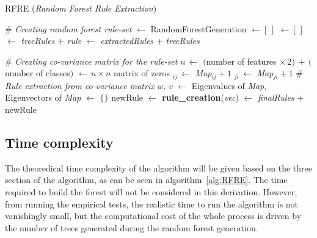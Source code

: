 \documentclass[10pt]{article}
\begin{document}
\begin{algorithm}[!ht]
\caption{RFRE (\textit{Random Forest Rule Extraction})}\label{alg:RFRE}
\begin{algorithmic}
\State \# {\sl Creating random forest rule-set}
 $\gets$ RandomForestGeneration		
 $\gets [\, ]$
	  $\gets [\,]$
		 $\gets$ {\sl treeRules} $+$ {\sl rule} 
	\EndFor
	 $\gets$ {\sl extractedRules} + {\sl treeRules}
\EndFor

\State
\State \# {\sl Creating co-variance matrix for the rule-set}
\State $n \, \gets$ $($number of features $\times \, 2) \, + \,($number of classes$)$ 
 $\gets \, n\times n$ matrix of zeros
		$_{ij} \, \gets$  {\sl Map}$_{ij} + 1$
		$_{ji} \, \gets$  {\sl Map}$_{ji} + 1$
	\EndIf
\EndFor
\State 
\State \# {\sl Rule extraction from co-variance matrix}
\State $w, \, v$ $\gets$ Eigenvalues of {\sl Map}, Eigenvectors of {\sl Map }
 $\gets$ $\{\}$
	\State newRule $\gets $ \textbf{rule\_creation}({\sl  vec})
	 $\gets$ {\sl finalRules} $+$ newRule
	\EndIf
\EndFor
\State {}
\end{algorithmic}
\end{algorithm}

\subsection{Time complexity}
The theoredical time complexity of the algorithm will be given based on the three section of the algorithm, as can be seen in algorithm~\ref{alg:RFRE}. The time required to build the forest will not be considered in this derivation. However, from running the empirical tests, the realistic time to run the algorithm is not vanishingly small, but the computational cost of the whole process is driven by the number of trees generated during the random forest generation.
\end{document}
